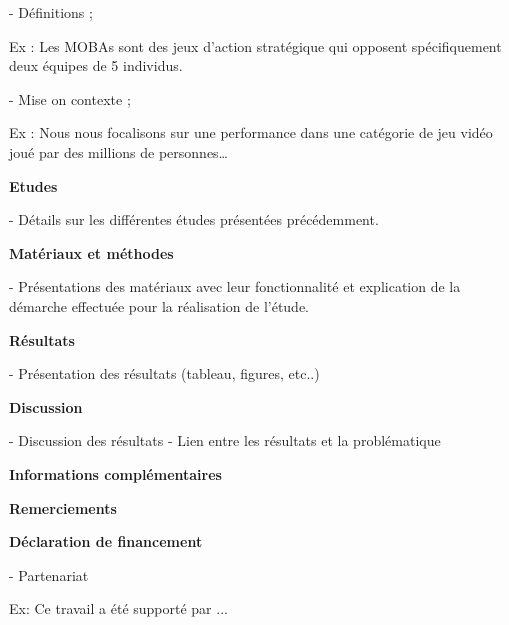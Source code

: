 \documentclass[11pt,oneside]{article}
\begin{document}
-	Définitions ;

\begin{flushleft}
Ex : Les MOBAs sont des jeux d’action stratégique qui opposent spécifiquement deux équipes de 5 individus.
\end{flushleft}

-	Mise on contexte ;

\begin{flushleft}
Ex : Nous nous focalisons sur une performance dans une catégorie de jeu vidéo joué par des millions de personnes…
\end{flushleft}

\begin{flushleft}
\textbf{Etudes}
\end{flushleft}

-	Détails sur les différentes études présentées précédemment.

\begin{flushleft}
\textbf{Matériaux et méthodes}
\end{flushleft}

-	Présentations des matériaux avec leur fonctionnalité et explication de la démarche effectuée pour la réalisation de l’étude. 

\begin{flushleft}
\textbf{Résultats}
\end{flushleft}

-	Présentation des résultats (tableau, figures, etc..)

\begin{flushleft}
\textbf{Discussion}
\end{flushleft}

-	Discussion des résultats
-	Lien entre les résultats et la problématique


\begin{flushleft}
\textbf{Informations complémentaires}
\end{flushleft}

\begin{flushleft}
\textbf{Remerciements}
\end{flushleft}

\newpage

\begin{flushleft}
\textbf{Déclaration de financement}
\end{flushleft}

-	Partenariat

\begin{flushleft}
Ex: Ce travail a été supporté par ...
\end{flushleft}
\end{document}
